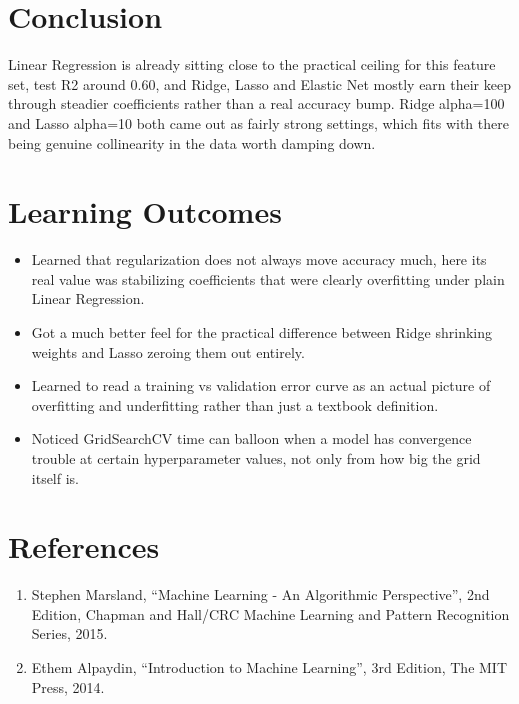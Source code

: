 \documentclass[12pt,a4paper]{article}
\begin{document}
\section{Conclusion}
Linear Regression is already sitting close to the practical ceiling for this feature set, test R2
around 0.60, and Ridge, Lasso and Elastic Net mostly earn their keep through steadier coefficients
rather than a real accuracy bump. Ridge alpha=100 and Lasso alpha=10 both came out as fairly strong
settings, which fits with there being genuine collinearity in the data worth damping down.

\section{Learning Outcomes}
\begin{itemize}
\item Learned that regularization does not always move accuracy much, here its real value was
stabilizing coefficients that were clearly overfitting under plain Linear Regression.
\item Got a much better feel for the practical difference between Ridge shrinking weights and Lasso
zeroing them out entirely.
\item Learned to read a training vs validation error curve as an actual picture of overfitting and
underfitting rather than just a textbook definition.
\item Noticed GridSearchCV time can balloon when a model has convergence trouble at certain
hyperparameter values, not only from how big the grid itself is.
\end{itemize}

\section{References}
\begin{enumerate}
\item Stephen Marsland, ``Machine Learning - An Algorithmic Perspective'', 2nd Edition, Chapman and
Hall/CRC Machine Learning and Pattern Recognition Series, 2015.
\item Ethem Alpaydin, ``Introduction to Machine Learning'', 3rd Edition, The MIT Press, 2014.
\end{enumerate}
\end{document}

